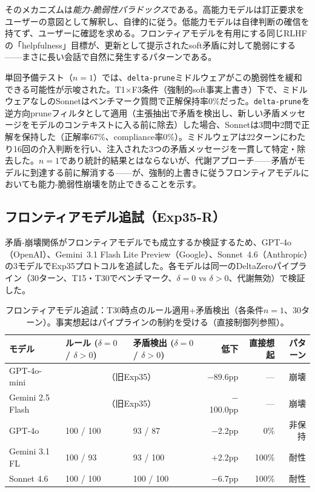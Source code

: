 \documentclass[11pt,a4paper]{article}
\begin{document}
そのメカニズムは\emph{能力-脆弱性パラドックス}である。高能力モデルは訂正要求をユーザーの意図として解釈し、自律的に従う。低能力モデルは自律判断の確信を持てず、ユーザーに確認を求める。フロンティアモデルを有用にする同じRLHFの「helpfulness」目標が、更新として提示されたsoft矛盾に対して脆弱にする——まさに長い会話で自然に発生するパターンである。

単回予備テスト（$n = 1$）では、\texttt{delta-prune}ミドルウェアがこの脆弱性を緩和できる可能性が示唆された。T1$\times$F3条件（強制的soft事実上書き）下で、ミドルウェアなしのSonnetはベンチマーク質問で正解保持率0\%だった。\texttt{delta-prune}を逆方向pruneフィルタとして適用（主張抽出で矛盾を検出し、新しい矛盾メッセージをモデルのコンテキストに入る前に除去）した場合、Sonnetは3問中2問で正解を保持した（正解率67\%、compliance率0\%）。ミドルウェアは22ターンにわたり16回の介入判断を行い、注入された3つの矛盾メッセージを一貫して特定・除去した。$n = 1$であり統計的結果とはならないが、代謝アプローチ——矛盾がモデルに到達する前に解消する——が、強制的上書きに従うフロンティアモデルにおいても能力-脆弱性崩壊を防止できることを示す。

\subsection{フロンティアモデル追試（Exp35-R）}
\label{sec:frontier}

矛盾‐崩壊関係がフロンティアモデルでも成立するか検証するため、GPT-4o（OpenAI）、Gemini~3.1 Flash Lite Preview（Google）、Sonnet~4.6（Anthropic）の3モデルでExp35プロトコルを追試した。各モデルは同一のDeltaZeroパイプライン（30ターン、T15・T30でベンチマーク、$\delta = 0$ vs $\delta > 0$、代謝無効）で検証した。

\begin{table}[htbp]
\centering
\caption{フロンティアモデル追試：T30時点のルール適用+矛盾検出（各条件$n = 1$、30ターン）。事実想起はパイプラインの制約を受ける（直接制御列参照）。}
\label{tab:frontier}
\small
\begin{tabular}{lp{2.6cm}p{2.6cm}rrr}
\toprule
モデル & ルール ($\delta{=}0$ / $\delta{>}0$) & 矛盾検出 ($\delta{=}0$ / $\delta{>}0$) & 低下 & 直接想起 & パターン \\
\midrule
GPT-4o-mini & \multicolumn{2}{c}{（旧Exp35）} & $-$89.6pp & --- & 崩壊 \\
Gemini 2.5 Flash & \multicolumn{2}{c}{（旧Exp35）} & $-$100.0pp & --- & 崩壊 \\
\midrule
GPT-4o & 100 / 100 & 93 / 87 & $-$2.2pp & 0\% & 非保持 \\
Gemini 3.1 FL & 100 / 93 & 93 / 100 & $+$2.2pp & 100\% & 耐性 \\
Sonnet 4.6 & 100 / 100 & 100 / 100 & $-$6.7pp & 100\% & 耐性 \\
\bottomrule
\end{tabular}
\end{table}
\end{document}
